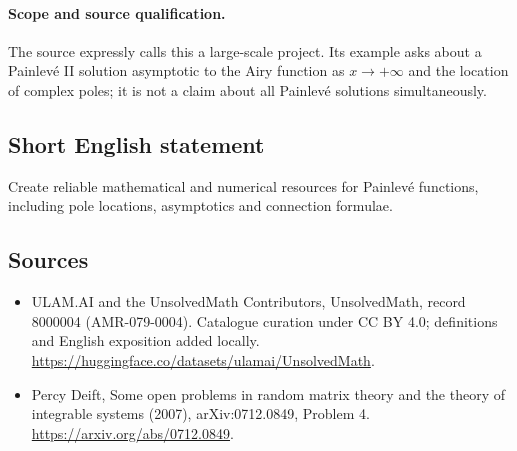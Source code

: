 \documentclass[11pt]{article}
\begin{document}
\paragraph{Scope and source qualification.}The source expressly calls this a large-scale project. Its example asks about a Painlevé II solution asymptotic to the Airy function as $x\to+\infty$ and the location of complex poles; it is not a claim about all Painlevé solutions simultaneously.
\subsection{Short English statement}
Create reliable mathematical and numerical resources for Painlevé functions, including pole locations, asymptotics and connection formulae.
\subsection{Sources}
\begin{itemize}
\item[\hypertarget{source:8000004:1}{S1}] ULAM.AI and the UnsolvedMath Contributors, UnsolvedMath, record 8000004 (AMR-079-0004). Catalogue curation under CC BY 4.0; definitions and English exposition added locally.
\url{https://huggingface.co/datasets/ulamai/UnsolvedMath}.
\item[\hypertarget{source:8000004:2}{S2}] Percy Deift, Some open problems in random matrix theory and the theory of integrable systems (2007), arXiv:0712.0849, Problem 4.
\url{https://arxiv.org/abs/0712.0849}.
\end{itemize}
\label{end:8000004}
\end{document}
